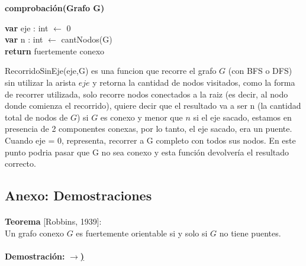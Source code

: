 \vspace*{3cm}

\incmargin{1em}
\linesnumbered
{}

\textbf{comprobación(Grafo G)}\\
	\begin{algorithm}[H]

    \textbf{var} eje : int $\leftarrow$ 0 \\
    \textbf{var} n : int $\leftarrow$ cantNodos(G) \\
				


      \textbf{return} fuertemente conexo

  \end{algorithm}

RecorridoSinEje(eje,G) es una funcion que recorre el grafo $G$  (con BFS o DFS) sin utilizar la arista $eje$ y retorna la cantidad de nodos visitados, como la forma de recorrer utilizada, solo recorre nodos conectados a la raiz (es decir, al nodo donde comienza el recorrido), quiere decir que el resultado va a ser n (la cantidad total de nodos de $G$) si $G$ es conexo y menor que $n$ si el eje sacado, estamos en presencia de 2 componentes conexas, por lo tanto, el eje sacado, era un puente. Cuando eje = 0, representa, recorrer a G completo con todos sus nodos. En este punto podria pasar que G no sea conexo y esta función devolvería el resultado correcto.


\subsection{Anexo: Demostraciones}
\label{demostraciones2}


\paragraph{}
\textbf{Teorema} [Robbins, 1939]:\\
Un grafo conexo $G$ es fuertemente orientable si y solo si $G$ no tiene puentes.


\paragraph{} 
\textbf{Demostración:} \underline{\textbf{$\rightarrow$)}}

